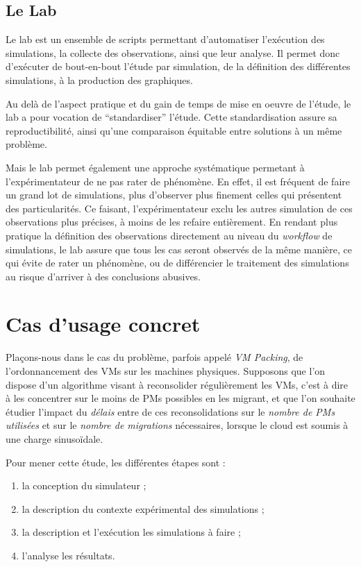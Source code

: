 \documentclass[parallelisme]{compas2017}
\begin{document}
\subsection{Le Lab}

Le lab est un ensemble de scripts permettant d'automatiser l'exécution des simulations, la collecte des
observations, ainsi que leur analyse. Il permet donc d'exécuter de bout-en-bout l'étude par simulation,
de la définition des différentes simulations, à la production des graphiques.

Au delà de l'aspect pratique et du gain de temps de mise en oeuvre de l'étude, le lab a pour vocation
de ``standardiser'' l'étude. Cette standardisation assure sa reproductibilité, ainsi qu'une comparaison
équitable entre solutions à un même problème.

Mais le lab permet également une approche systématique permetant à l'expérimentateur de ne pas rater 
de phénomène. En effet, il est fréquent de faire un grand lot de simulations, plus d'observer plus
finement celles qui présentent des particularités. Ce faisant, l'expérimentateur exclu les autres 
simulation de ces observations plus précises, à moins de les refaire entièrement. En rendant plus 
pratique la définition des observations directement au niveau du \textit{workflow} de simulations, 
le lab assure que tous les cas seront observés de la même manière, ce qui évite de rater un phénomène,
ou de différencier le traitement des simulations au risque d'arriver à des conclusions abusives.


\section{Cas d'usage concret}

Plaçons-nous dans le cas du problème, parfois appelé \textit{VM Packing}, de 
l'ordonnancement des VMs sur les machines physiques. 
Supposons que l'on dispose d'un algorithme visant à reconsolider 
régulièrement les VMs, c'est à dire à les concentrer sur le moins de PMs 
possibles en les migrant, et que l'on souhaite étudier l'impact du \emph{délais}
entre de ces reconsolidations sur le \emph{nombre de PMs utilisées} et sur le 
\emph{nombre de migrations} nécessaires, lorsque le cloud est soumis à une 
charge sinusoïdale.

Pour mener cette étude, les différentes étapes sont :
\begin{enumerate}
 \item la conception du simulateur ;
 \item la description du contexte expérimental des simulations ;
 \item la description et l'exécution les simulations à faire ;
 \item l'analyse les résultats.
\end{enumerate}
\end{document}
